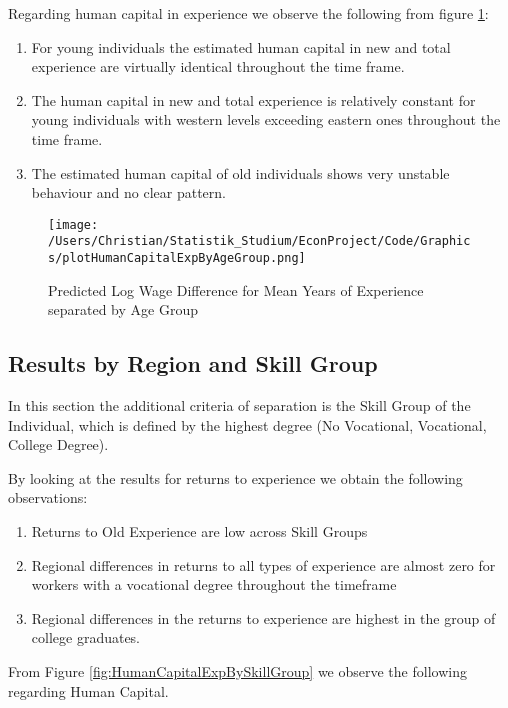\documentclass{article}
\begin{document}
Regarding human capital in experience we observe the following from figure \ref{fig:HumanCapitalExpByAgeGroup}:

\begin{enumerate}
	\item For young individuals the estimated human capital in new and total experience are virtually identical throughout the time frame.
	\item The human capital in new and total experience is relatively constant for young individuals with western levels exceeding eastern ones throughout the time frame.
	\item The estimated human capital of old individuals shows very unstable behaviour and no clear pattern.

\end{enumerate}


\begin{figure}[!h]
    \centering
    \texttt{[image: /Users/Christian/Statistik\_Studium/EconProject/Code/Graphics/plotHumanCapitalExpByAgeGroup.png]}
    \caption{Predicted Log Wage Difference for Mean Years of Experience separated by Age Group}
    \label{fig:HumanCapitalExpByAgeGroup}
\end{figure}

\FloatBarrier
\subsection{Results by Region and Skill Group}
In this section the additional criteria of separation is the Skill Group of the Individual, which is defined by the highest degree (No Vocational, Vocational, College Degree).

By looking at the results for returns to experience  we obtain the following observations:

\begin{enumerate}
	\item Returns to Old Experience are low across Skill Groups
	\item Regional differences in returns to all types of experience are almost zero for workers with a vocational degree throughout the timeframe
	\item Regional differences in the returns to experience are highest in the group of college graduates.
\end{enumerate}

From Figure \ref{fig:HumanCapitalExpBySkillGroup} we observe the following regarding Human Capital.
\end{document}
